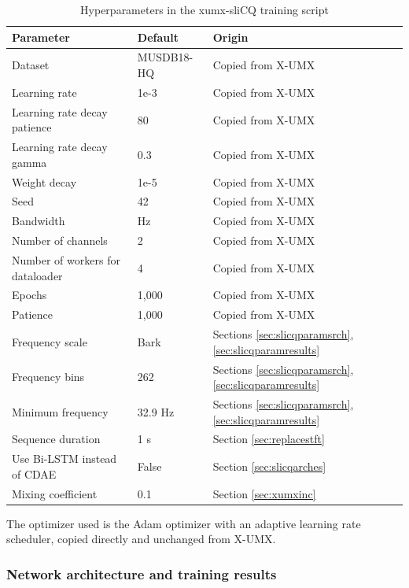 \documentclass[report.tex]{subfiles}
\begin{document}
\begin{table}[ht]
	\centering
	\caption{Hyperparameters in the xumx-sliCQ training script}
	\label{table:xumxslicqparams}
	\begin{tabular}{ |l|l|l| }
	 \hline
		Parameter & Default & Origin \\
	 \hline
	 \hline
		Dataset & MUSDB18-HQ & Copied from X-UMX \\
	 \hline
		Learning rate & 1e-3 & Copied from X-UMX \\
	 \hline
		Learning rate decay patience & 80 & Copied from X-UMX \\
	 \hline
		Learning rate decay gamma & 0.3 & Copied from X-UMX \\
	 \hline
		Weight decay & 1e-5 & Copied from X-UMX \\
	 \hline
	 	Seed & 42 & Copied from X-UMX \\
	 \hline
		Bandwidth & \hlblu{16,000} Hz & Copied from X-UMX \\
	 \hline
	 	Number of channels & 2 & Copied from X-UMX \\
	 \hline
	 	Number of workers for dataloader & 4 & Copied from X-UMX \\
	 \hline
		Epochs & 1,000 & Copied from X-UMX \\
	 \hline
		Patience & 1,000 & Copied from X-UMX \\
	 \hline
		Frequency scale & Bark & Sections \ref{sec:slicqparamsrch}, \ref{sec:slicqparamresults} \\
	 \hline
		Frequency bins & 262 & Sections \ref{sec:slicqparamsrch}, \ref{sec:slicqparamresults} \\
	 \hline
	 	Minimum frequency & 32.9 Hz & Sections \ref{sec:slicqparamsrch}, \ref{sec:slicqparamresults} \\
	 \hline
		Sequence duration & 1 s & Section \ref{sec:replacestft} \\
	 \hline
		Use Bi-LSTM instead of CDAE & False & Section \ref{sec:slicqarches} \\
	 \hline
		Mixing coefficient & 0.1 & Section \ref{sec:xumxinc} \\
	 \hline
\end{tabular}
\end{table}

The optimizer used is the Adam optimizer with an adaptive learning rate scheduler, copied directly and unchanged from X-UMX.

\subsubsection{Network architecture and training results}
\label{sec:networktraining}
\end{document}
